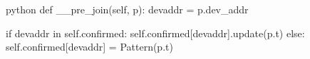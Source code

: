 \begin{mintedbox}[samepage]{python}
def __pre_join(self, p):
    devaddr = p.dev_addr

    if devaddr in self.confirmed:
        self.confirmed[devaddr].update(p.t)
    else:
        self.confirmed[devaddr] = Pattern(p.t)
\end{mintedbox}
